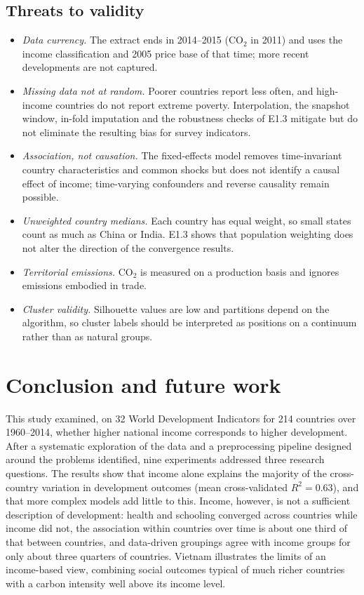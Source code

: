 \documentclass[11pt,a4paper]{article}
\begin{document}
\subsection{Threats to validity}\label{sec:validity}
\begin{itemize}
\item \emph{Data currency.} The extract ends in 2014--2015 (CO$_2$ in 2011) and uses the income classification and 2005 price base of that time; more recent developments are not captured.
\item \emph{Missing data not at random.} Poorer countries report less often, and high-income countries do not report extreme poverty. Interpolation, the snapshot window, in-fold imputation and the robustness checks of E1.3 mitigate but do not eliminate the resulting bias for survey indicators.
\item \emph{Association, not causation.} The fixed-effects model removes time-invariant country characteristics and common shocks but does not identify a causal effect of income; time-varying confounders and reverse causality remain possible.
\item \emph{Unweighted country medians.} Each country has equal weight, so small states count as much as China or India. E1.3 shows that population weighting does not alter the direction of the convergence results.
\item \emph{Territorial emissions.} CO$_2$ is measured on a production basis and ignores emissions embodied in trade.
\item \emph{Cluster validity.} Silhouette values are low and partitions depend on the algorithm, so cluster labels should be interpreted as positions on a continuum rather than as natural groups.
\end{itemize}

\section{Conclusion and future work}\label{sec:conclusion}
This study examined, on 32 World Development Indicators for 214 countries over 1960--2014, whether higher national income corresponds to higher development. After a systematic exploration of the data and a preprocessing pipeline designed around the problems identified, nine experiments addressed three research questions. The results show that income alone explains the majority of the cross-country variation in development outcomes (mean cross-validated $R^2 = 0.63$), and that more complex models add little to this. Income, however, is not a sufficient description of development: health and schooling converged across countries while income did not, the association within countries over time is about one third of that between countries, and data-driven groupings agree with income groups for only about three quarters of countries. Vietnam illustrates the limits of an income-based view, combining social outcomes typical of much richer countries with a carbon intensity well above its income level.
\end{document}
